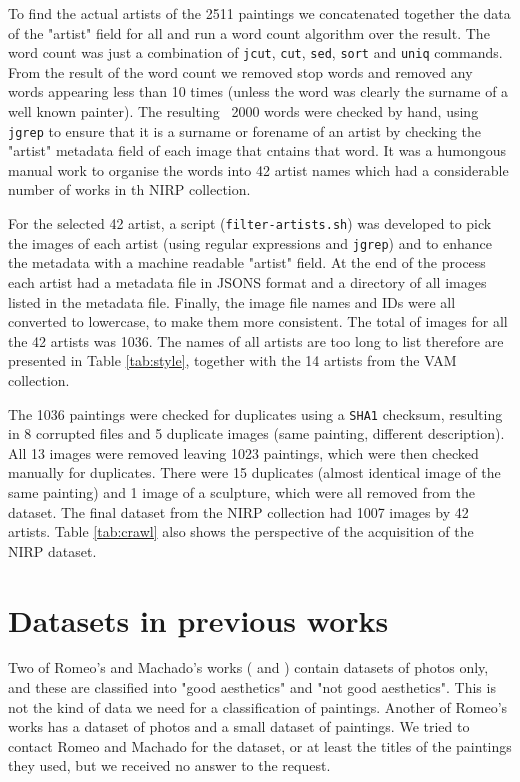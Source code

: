 \documentclass[11pt,a4paper,twoside,openright,draft]{report}
\begin{document}
\begin{multicols}{2}
To find the actual artists of the 2511 paintings we concatenated together the
data of the "artist" field for all and run a word count algorithm over the
result.  The word count was just a combination of \texttt{jcut}, \texttt{cut},
\texttt{sed}, \texttt{sort} and \texttt{uniq} commands.  From the result of the
word count we removed stop words and removed any words appearing less than 10
times (unless the word was clearly the surname of a well known painter).  The
resulting ~2000 words were checked by hand, using \texttt{jgrep} to ensure that
it is a surname or forename of an artist by checking the "artist" metadata
field of each image that cntains that word.  It was a humongous manual work to
organise the words into 42 artist names which had a considerable number of
works in th NIRP collection.

For the selected 42 artist, a script (\texttt{filter-artists.sh}) was developed
to pick the images of each artist (using regular expressions and
\texttt{jgrep}) and to enhance the metadata with a machine readable "artist"
field.  At the end of the process each artist had a metadata file in JSONS
format and a directory of all images listed in the metadata file.  Finally, the
image file names and IDs were all converted to lowercase, to make them more
consistent.  The total of images for all the 42 artists was 1036.  The names of
all artists are too long to list therefore are presented in Table
\ref{tab:style}, together with the 14 artists from the VAM collection.

The 1036 paintings were checked for duplicates using a \texttt{SHA1} checksum,
resulting in 8 corrupted files and 5 duplicate images (same painting, different
description).  All 13 images were removed leaving 1023 paintings, which were
then checked manually for duplicates.  There were 15 duplicates (almost
identical image of the same painting) and 1 image of a sculpture, which were
all removed from the dataset.  The final dataset from the NIRP collection had
1007 images by 42 artists.  Table \ref{tab:crawl} also shows the perspective of
the acquisition of the NIRP dataset.

\section{Datasets in previous works}

Two of Romeo's and Machado's works (\cite{jma12clas} and \cite{cmrc13fs})
contain datasets of photos only, and these are classified into "good
aesthetics" and "not good aesthetics".  This is not the kind of data we need
for a classification of paintings.  Another of Romeo's works \cite{rmc12ajs}
has a dataset of photos and a small dataset of paintings.  We tried to contact
Romeo and Machado for the dataset, or at least the titles of the paintings they
used, but we received no answer to the request.


\end{multicols}
\end{document}
